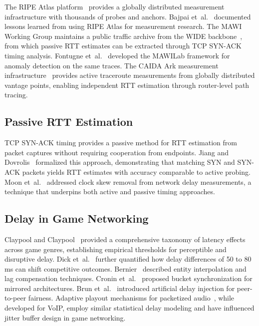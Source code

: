 \documentclass[conference]{IEEEtran}
\begin{document}
The RIPE Atlas platform~\cite{ripeatlas} provides a globally distributed measurement infrastructure with thousands of probes and anchors. Bajpai et~al.~\cite{bajpai2015} documented lessons learned from using RIPE Atlas for measurement research. The MAWI Working Group maintains a public traffic archive from the WIDE backbone~\cite{mawi, cho2000}, from which passive RTT estimates can be extracted through TCP SYN-ACK timing analysis. Fontugne et~al.~\cite{fontugne2010} developed the MAWILab framework for anomaly detection on the same traces. The CAIDA Ark measurement infrastructure~\cite{caida} provides active traceroute measurements from globally distributed vantage points, enabling independent RTT estimation through router-level path tracing.

\subsection{Passive RTT Estimation}

TCP SYN-ACK timing provides a passive method for RTT estimation from packet captures without requiring cooperation from endpoints. Jiang and Dovrolis~\cite{jiang2002} formalized this approach, demonstrating that matching SYN and SYN-ACK packets yields RTT estimates with accuracy comparable to active probing. Moon et~al.~\cite{moon2000} addressed clock skew removal from network delay measurements, a technique that underpins both active and passive timing approaches.

\subsection{Delay in Game Networking}

Claypool and Claypool~\cite{claypool2006} provided a comprehensive taxonomy of latency effects across game genres, establishing empirical thresholds for perceptible and disruptive delay. Dick et~al.~\cite{dick2005} further quantified how delay differences of 50 to 80\,ms can shift competitive outcomes. Bernier~\cite{bernier2001} described entity interpolation and lag compensation techniques. Cronin et~al.~\cite{cronin2004} proposed bucket synchronization for mirrored architectures. Brun et~al.~\cite{brun2006} introduced artificial delay injection for peer-to-peer fairness. Adaptive playout mechanisms for packetized audio~\cite{ramjee1994}, while developed for VoIP, employ similar statistical delay modeling and have influenced jitter buffer design in game networking.

\end{document}
